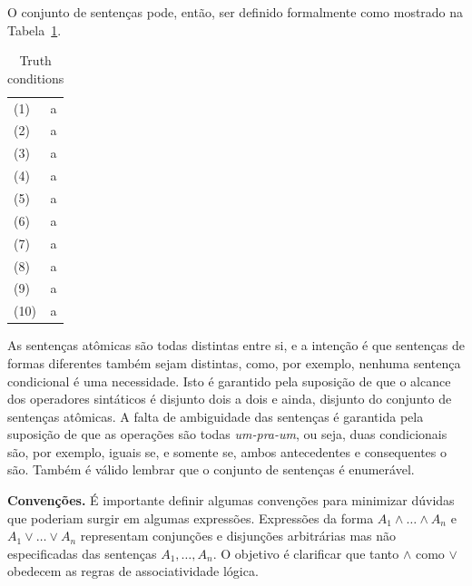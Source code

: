 O conjunto de sentenças pode, então, ser definido formalmente como mostrado na
Tabela~\ref{table:sentences}.

\begin{center}
    \begin{table}[h!]
\label{table:sentences}
    \caption{Truth conditions}

    \begin{tabular}{ll}
        \vspace{2mm}
        (1) & a \\
        \vspace{2mm}
        (2)  & a \\
        \vspace{2mm}
        (3)  & a \\
        \vspace{2mm}
        (4)  &a \\
        \vspace{2mm}
        (5)  & a \\
        \vspace{2mm}
        (6)  &a \\
        \vspace{2mm}
        (7)  &a \\
        \vspace{2mm}
        (8)  &a \\
        \vspace{2mm}
        (9)  &a \\
        \vspace{2mm}
        (10) &a
    \end{tabular}
\end{table}
\end{center}

As sentenças at\^omicas são todas distintas entre si, e a intenção é que sentenças
de formas diferentes também sejam distintas, como, por exemplo, nenhuma sentença
condicional é uma necessidade. Isto é garantido pela suposição de que o alcance
dos operadores sintáticos é disjunto dois a dois e ainda, disjunto do conjunto
de sentenças at\^omicas.
A falta de ambiguidade das sentenças é garantida pela suposição de que as
operações são todas \textit{um-pra-um}, ou seja, duas condicionais são, por
exemplo, iguais se, e somente se, ambos antecedentes e consequentes o são.
Também é válido lembrar que o conjunto de sentenças é enumerável.

\textbf{Convenções.} É importante definir algumas convenções para minimizar 
dúvidas que poderiam surgir em algumas expressões.
Expressões da forma $A_1 \wedge \ldots \wedge A_n$ e $A_1 \vee \ldots \vee A_n$
representam conjunções e disjunções arbitrárias mas não especificadas das
sentenças $A_1,\ldots,A_n$. O objetivo é clarificar que tanto $\wedge$ como
$\vee$ obedecem as regras de associatividade lógica. 

